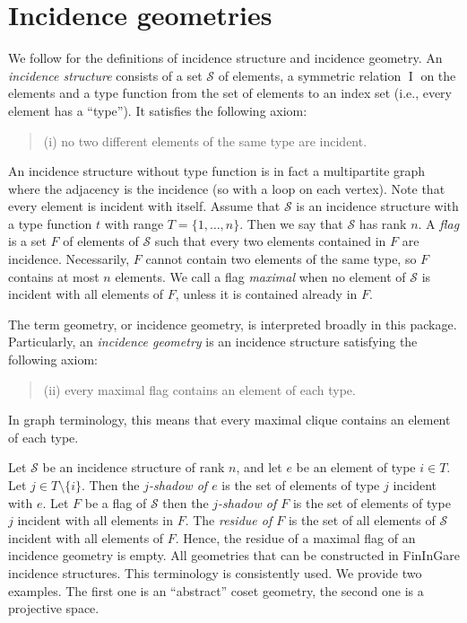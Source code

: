 \documentclass{article}
\def\fining{{\sf FinInG}}
\def\cS{\mathcal{S}}
\DeclareMathOperator\I{\mathrm{I}}
\begin{document}
\section{Incidence geometries}

We follow \cite{BC13} for the definitions of incidence structure and incidence geometry. An {\em incidence structure} 
consists of a set $\cS$ of elements, a symmetric relation $\I$ on the elements and a type function from the set of 
elements to an index set (i.e., every element has a ``type''). It satisfies the following axiom: 
\begin{quote}
(i) no two different elements of the same type are incident. 
\end{quote}
An incidence structure without type function is in fact a multipartite graph where 
the adjacency is the incidence (so with a loop on each vertex). Note that every element is incident with itself.
Assume that $\cS$ is an incidence structure with a type function $t$ with range $T = \{1,\ldots,n\}$. Then we say that $\cS$ has rank $n$.
A {\em flag} is a set $F$ of elements of $\cS$ such that every two elements contained in $F$ are incidence. Necessarily, 
$F$ cannot contain two elements of the same type, so $F$ contains at most $n$ elements. We call a flag {\em maximal} when
no element of $\cS$ is incident with all elements of $F$, unless it is contained already in $F$.

The term geometry, or incidence geometry, is interpreted broadly in this package. Particularly, an {\em incidence geometry} is an 
incidence structure satisfying the following axiom: 
\begin{quote}
(ii) every maximal flag contains an element of each type. 
\end{quote}
In graph terminology, this means that every maximal clique contains an element of each type.

Let $\cS$ be an incidence structure of rank $n$, and let $e$ be an element of type $i \in T$. Let $j \in T \setminus \{i\}$. 
Then the {\em $j$-shadow of $e$} is the set of elements of type $j$ incident with $e$. Let $F$ be a flag of $\cS$ then
the {\em $j$-shadow of $F$} is the set of elements of type $j$ incident with all elements in $F$. The {\em residue of $F$}
is the set of all elements of $\cS$ incident with all elements of $F$. Hence, the residue of a maximal flag of an incidence geometry 
is empty. All geometries that can be constructed in \fining are incidence structures. This terminology is consistently used. We 
provide two examples. The first one is an ``abstract'' coset geometry, the second one is a projective space.
\end{document}
